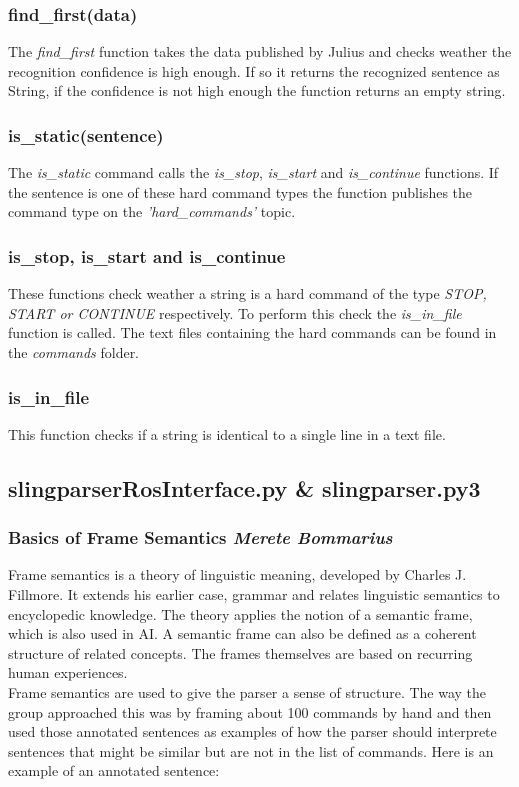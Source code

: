 \documentclass[main.tex]{subfiles}
\begin{document}
        \subsubsection{find\_first(data)}
            The \textit{find\_first} function takes the data published by Julius and checks weather the recognition confidence is high enough. If so it returns the recognized sentence as String, if the confidence is not high enough the function returns an empty string.\\
    
        \subsubsection{is\_static(sentence)}
            The \textit{is\_static} command calls the \textit{is\_stop}, \textit{is\_start} and \textit{is\_continue} functions. If the sentence is one of these hard command types the function publishes the command type on the \textit{'hard\_commands'} topic.
    
        \subsubsection{is\_stop, is\_start and is\_continue}
            These functions check weather a string is a hard command of the type \textit{STOP, START or CONTINUE} respectively. To perform this check the \textit{is\_in\_file} function is called. The text files containing the hard commands can be found in the \textit{commands} folder.
    
        \subsubsection{is\_in\_file}
            This function checks if a string is identical to a single line in a text file.
    
    \subsection{slingparserRosInterface.py \& slingparser.py3}     	
        \subsubsection{Basics of Frame Semantics \small{\textit{Merete Bommarius}}}        
            Frame semantics is a theory of linguistic meaning, developed by Charles J. Fillmore. It extends his earlier case, grammar and relates linguistic semantics to encyclopedic knowledge. The theory applies the notion of a semantic frame, which is also used in AI. A semantic frame can also be defined as a coherent structure of related concepts. The frames themselves are based on recurring human experiences.\\
            Frame semantics are used to give the parser a sense of structure. The way the group approached this was by framing about 100 commands by hand and then used those annotated sentences as examples of how the parser should interprete sentences that might be similar but are not in the list of commands. 
            Here is an example of an annotated sentence: 
    
\end{document}
